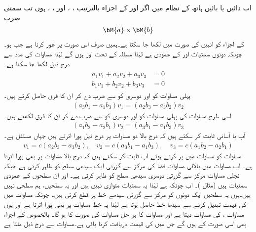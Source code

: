 اب دائیں یا بائیں ہاتھ کے نظام میں اگر  اور  کے اجزاء بالترتیب ، ،  اور ، ،  ہوں تب سمتی ضرب 
\begin{align*}
\bM{a}\times \bM{b}
\end{align*}
کے اجزاء کو انہیں کی صورت میں لکھا جا سکتا ہے۔ہمیں صرف اس صورت پر غور کرنا ہے جب  ہو۔چونکہ  دونوں سمتیات  اور  کے عمودی ہے لہٰذا مسئلہ  کے تحت  اور  ہوں گے لہٰذا مساوات  کی مدد سے درج ذیل لکھا جا سکتا ہے۔
\begin{gather}
\begin{aligned}\label{مساوات_الجبرا_سمتی_ضرب_اجزاء_کی_صورت_الف}
a_1v_1+a_2v_2+a_3v_3&=0\\
b_1v_1+b_2v_2+b_3v_3&=0
\end{aligned}
\end{gather}
پہلی مساوات کو  اور دوسری کو  سے ضرب دے کر ان کا فرق حاصل کرتے ہیں۔
\begin{align*}
(a_3b_1-a_1b_3)v_1=(a_2b_3-a_3b_2)v_2
\end{align*}
اسی طرح مساوات  کی پہلی مساوات کو  اور دوسری کو  سے ضرب دے کر ان کا فرق  لکھتے ہیں۔ 
\begin{align*}
(a_1b_2-a_2b_1)v_2=(a_3b_1-a_1b_3)v_3
\end{align*}
آپ با آسانی ثابت کر سکتے ہیں کہ درج بالا دو مساوات پر درج ذیل  پورا اترتے ہیں جہاں  مستقل ہے۔
\begin{align}\label{مساوات_الجبرا_سمتی_ضرب_اجزاء_کی_صورت_ب}
v_1=c(a_2b_3-a_3b_2),\quad v_2=c(a_3b_1-a_1b_3),\quad v_3=c(a_1b_2-a_2b_1)
\end{align}
مساوات  کو مساوات  میں پر کرتے ہوئے آپ ثابت کر سکتے ہیں کہ  درج بالا مساوات  پر بھی پورا اترتا ہے۔ اب مساوات  میں بالائی  مساوات   فضا کی مرکز سے گزرتی ایک سیدھی سطح کو ظاہر کرتی ہے جبکہ نچلی مساوات مرکز سے گزرتی دوسری سیدھی سطح کو ظاہر کرتی ہے۔ اور  ان سطحوں کے عمودی سمتیات ہیں (مثال )۔ اب چونکہ  ہے لہٰذا یہ سمتیات متوازی نہیں ہیں اور یہ سطحیں، ہم سطحی نہیں ہیں۔یوں یہ سطحیں  ایک دونوں کو مرکز سے گزرتی سیدھے خط  پر قطع کرتی ہیں۔ چونکہ مساوات  میں  کی قیمت تبدیل کرنے سے سیدھا خط حاصل ہوتا ہے لہٰذا  یہ خط مساوات  پر بھی پورا اترتا ہے  اور یوں مساوات ،  کی مساوات دیتا ہے اور مساوات  کا ہر حل مساوات  کی صورت کا ہو گا۔ بالخصوص  کے اجزاء بھی اسی صورت کے ہوں گے جن میں  کی قیمت دریافت کرنا باقی ہے۔مساوات  سے درج ذیل ملتا ہے
